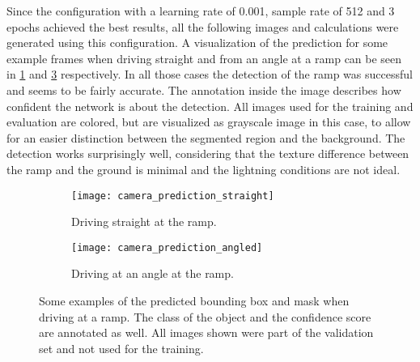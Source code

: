 Since the configuration with a learning rate of 0.001, sample rate of 512 and 3 epochs achieved the best results, all the following images and calculations were generated using this configuration.
A visualization of the prediction for some example frames when driving straight and from an angle at a ramp can be seen in \cref{fig:camera_prediction_straight} and \cref{fig:camera_prediction_angled} respectively.
In all those cases the detection of the ramp was successful and seems to be fairly accurate.
The annotation inside the image describes how confident the network is about the detection.
All images used for the training and evaluation are colored, but are visualized as grayscale image in this case, to allow for an easier distinction between the segmented region and the background.
The detection works surprisingly well, considering that the texture difference between the ramp and the ground is minimal and the lightning conditions are not ideal.

\begin{figure}[htb]
    \centering
    \begin{subfigure}{1\textwidth}
        \centering
        \texttt{[image: camera\_prediction\_straight]}
        \caption{Driving straight at the ramp.}
        \label{fig:camera_prediction_straight}
    \end{subfigure}
    
    \begin{subfigure}{1\textwidth}
        \centering
        \texttt{[image: camera\_prediction\_angled]}
        \caption{Driving at an angle at the ramp.}
        \label{fig:camera_prediction_angled}
    \end{subfigure}
    \caption[Visualization examples of predicted segmentation masks]{Some examples of the predicted bounding box and mask when driving at a ramp. The class of the object and the confidence score are annotated as well. All images shown were part of the validation set and not used for the training.}
\end{figure}

